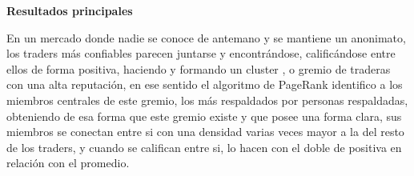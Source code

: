\documentclass{article}
\begin{document}
\textbf{Resultados principales}

En un mercado donde nadie se conoce de antemano y se mantiene un anonimato, los traders más confiables parecen juntarse y encontrándose, calificándose entre ellos de forma positiva, haciendo y formando un cluster , o gremio de traderas con una alta reputación, en ese sentido el algoritmo de PageRank identifico a los miembros centrales de este gremio, los más respaldados por personas respaldadas, obteniendo de esa forma que este gremio existe y que posee una forma clara, sus miembros se conectan entre si con una densidad varias veces mayor a la del resto de los traders, y cuando se califican entre si, lo hacen con el doble de positiva en relación con el promedio.
\end{document}
